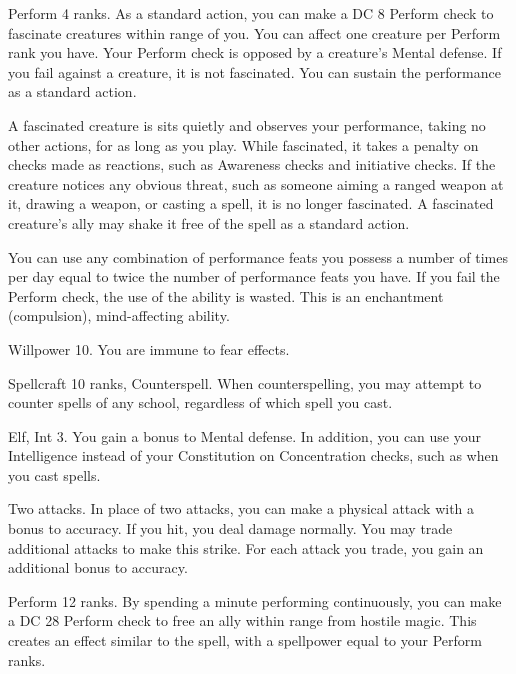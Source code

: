 \featpre Perform 4 ranks.
\featben As a standard action, you can make a DC 8 Perform check to fascinate creatures within \rngmed range of you.
You can affect one creature per Perform rank you have.
Your Perform check is opposed by a creature's Mental defense.
If you fail against a creature, it is not fascinated.
You can sustain the performance as a standard action.

A fascinated creature is sits quietly and observes your performance, taking no other actions, for as long as you play.
While fascinated, it takes a  penalty on checks made as reactions, such as Awareness checks and initiative checks.
If the creature notices any obvious threat, such as someone aiming a ranged weapon at it, drawing a weapon, or casting a spell, it is no longer fascinated.
A fascinated creature's ally may shake it free of the spell as a standard action.

You can use any combination of performance feats you possess a number of times per day equal to twice the number of performance feats you have.
If you fail the Perform check, the use of the ability is wasted.
This is an enchantment (compulsion), mind-affecting ability.

\featpre Willpower 10.
\featben You are immune to fear effects.

\featpres Spellcraft 10 ranks, Counterspell.
\featben When counterspelling, you may attempt to counter spells of any school, regardless of which spell you cast.

\featpre Elf, Int 3.
\featben You gain a  bonus to Mental defense.
In addition, you can use your Intelligence instead of your Constitution on Concentration checks, such as when you cast spells.

\featpre Two attacks.
\featben In place of two attacks, you can make a physical attack with a  bonus to accuracy.
If you hit, you deal damage normally.
You may trade additional attacks to make this strike.
For each attack you trade, you gain an additional  bonus to accuracy.

\featpre Perform 12 ranks.
\featben By spending a minute performing continuously, you can make a DC 28 Perform check to free an ally within \rngmed range from hostile magic.
This creates an effect similar to the 
spell, with a spellpower equal to your Perform ranks.

